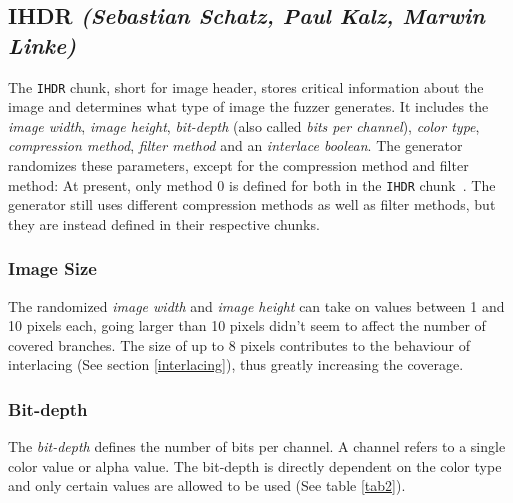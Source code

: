 \documentclass[runningheads]{llncs}
\begin{document}
\subsection{IHDR \normalfont\textit{(Sebastian Schatz, Paul Kalz, Marwin Linke)}}
The \texttt{IHDR} chunk, short for image header, stores critical information about the image and determines what type of image the fuzzer generates.
It includes the \textit{image width}, \textit{image height}, \textit{bit-depth} (also called \textit{bits per channel}), \textit{color type}, \textit{compression method}, \textit{filter method} and an \textit{interlace boolean}.
The generator randomizes these parameters, except for the compression method and filter method: At present, only method 0 is defined for both in the \texttt{IHDR} chunk~\cite{libpng_chunks}. The generator still uses different compression methods as well as filter methods, but they are instead defined in their respective chunks.

\subsubsection{Image Size}
The randomized \textit{image width} and \textit{image height} can take on values between 1 and 10 pixels each, going larger than 10 pixels didn't seem to affect the number of covered branches. 
The size of up to 8 pixels contributes to the behaviour of interlacing (See section \ref{interlacing}), thus greatly increasing the coverage.

\subsubsection{Bit-depth}
The \textit{bit-depth} defines the number of bits per channel. A channel refers to a single color value or alpha value.
The bit-depth is directly dependent on the color type and only certain values are allowed to be used (See table \ref{tab2}).
\end{document}
